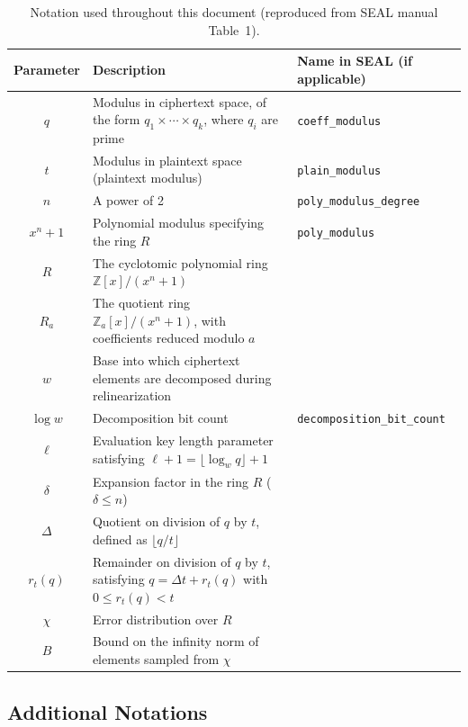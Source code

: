 \documentclass[11pt]{article}
\theoremstyle{definition}
\theoremstyle{remark}
\begin{document}
\begin{table}[ht]
\centering
\renewcommand{\arraystretch}{1.2}
\begin{tabular}{|c|p{8.5cm}|p{3.8cm}|}
\hline
\textbf{Parameter} & \textbf{Description} & \textbf{Name in SEAL (if applicable)} \\
\hline
$q$ & Modulus in ciphertext space, of the form $q_1 \times \cdots \times q_k$, where $q_i$ are prime & \texttt{coeff\_modulus} \\
\hline
$t$ & Modulus in plaintext space (plaintext modulus) & \texttt{plain\_modulus} \\
\hline
$n$ & A power of 2 & \texttt{poly\_modulus\_degree} \\
\hline
$x^n+1$ & Polynomial modulus specifying the ring $R$ & \texttt{poly\_modulus} \\
\hline
$R$ & The cyclotomic polynomial ring $\mathbb{Z}[x]/(x^n+1)$ & \\
\hline
$R_a$ & The quotient ring $\mathbb{Z}_a[x]/(x^n+1)$, with coefficients reduced modulo $a$ & \\
\hline
$w$ & Base into which ciphertext elements are decomposed during relinearization & \\
\hline
$\log w$ & Decomposition bit count & \texttt{decomposition\_bit\_count} \\
\hline
$\ell$ & Evaluation key length parameter satisfying $\ell+1 = \lfloor\log_w q\rfloor + 1$ & \\
\hline
$\delta$ & Expansion factor in the ring $R$ ($\delta \leq n$) & \\
\hline
$\Delta$ & Quotient on division of $q$ by $t$, defined as $\lfloor q/t\rfloor$ & \\
\hline
$r_t(q)$ & Remainder on division of $q$ by $t$, satisfying $q = \Delta t + r_t(q)$ with $0 \leq r_t(q) < t$ & \\
\hline
$\chi$ & Error distribution over $R$ & \\
\hline
$B$ & Bound on the infinity norm of elements sampled from $\chi$ & \\
\hline
\end{tabular}
\caption{Notation used throughout this document (reproduced from SEAL manual Table~1).}
\label{tab:notation}
\end{table}

\subsection*{Additional Notations}
\end{document}
